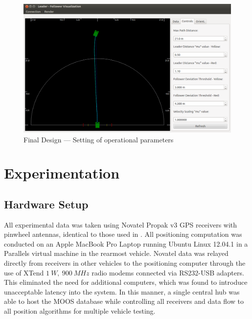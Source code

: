 \documentclass[12pt]{report}
\begin{document}

\begin{figure}[ht] \centering
    \includegraphics[width=6.5in]{./figs/final_design_opts.png}
    \caption{Final Design --- Setting of operational parameters }
    \label{fig:finaldesopts}
\end{figure}


\chapter{Experimentation}
\label{chap:exper}

\section{Hardware Setup}
\label{sec:hardware}

All experimental data was taken using Novatel Propak v3 GPS receivers with pinwheel antennas, identical to those used in \cite{scottthesis}. All positioning computation was conducted on an Apple MacBook Pro Laptop running Ubuntu Linux 12.04.1 in a Parallels virtual machine in the rearmost vehicle. Novatel data was relayed directly from receivers in other vehicles to the positioning computer through the use of XTend $1~W,~900~MHz$ radio modems connected via RS232-USB adapters. This eliminated the need for additional computers, which was found to introduce unacceptable latency into the system. In this manner, a single central hub was able to host the MOOS database while controlling all receivers and data flow to all position algorithms for multiple vehicle testing.
\end{document}
